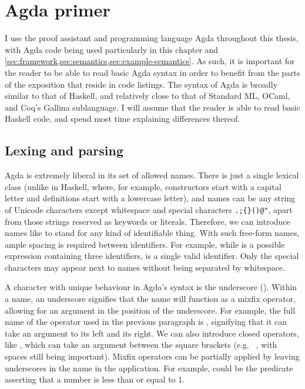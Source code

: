\section{Agda primer}\label{sec:agda-primer}

I use the proof assistant and programming language Agda throughout this thesis,
with Agda code being used particularly in this chapter and
\cref{sec:framework,sec:semantics,sec:example-semantics}.
As such, it is important for the reader to be able to read basic Agda syntax in
order to benefit from the parts of the exposition that reside in code listings.
The syntax of Agda is broadly similar to that of Haskell, and relatively close
to that of Standard ML, OCaml, and Coq's Gallina sublanguage.
I will assume that the reader is able to read basic Haskell code, and spend most
time explaining differences thereof.

\subsection{Lexing and parsing}

Agda is extremely liberal in its set of allowed names.
There is just a single lexical class (unlike in Haskell, where, for example,
constructors start with a capital letter and definitions start with a lowercase
letter), and names can be any string of Unicode characters except whitespace and
special characters \verb|.;{}()@"|, apart from those strings reserved as
keywords or literals.
Therefore, we can introduce names like
to stand for any kind of identifiable thing.
With such free-form names, ample spacing is required between identifiers.
For example, while \AgdaSpace{}\AgdaDatatype{$\leq$}\AgdaSpace{}%
 is a possible expression containing three
identifiers,  is a single
valid identifier.
Only the special characters may appear next to names without being separated by
whitespace.

A character with unique behaviour in Agda's syntax is the underscore
(\AgdaSymbol{\_}).
Within a name, an underscore signifies that the name will function as a mixfix
operator, allowing for an argument in the position of the underscore.
For example, the full name of the \AgdaDatatype{$\leq$} operator used in the
previous paragraph is \AgdaDatatype{\_$\leq$\_}, signifying that it can take an
argument to its left and its right.
We can also introduce closed operators, like \AgdaDatatype{[\_]}, which can take
an argument between the square brackets (e.g.\ \AgdaDatatype{[}\AgdaSpace{}%
\AgdaSpace{}\AgdaDatatype{]}, with spaces still being important).
Mixfix operators can be partially applied by leaving underscores in the name in
the application.
For example, \AgdaDatatype{\_$\leq$}\AgdaSpace{} could be the
predicate asserting that a number is less than or equal to 1.

